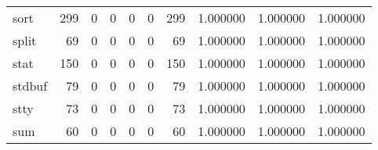 \begin{tabular}{lrrrrrrrrr}
sort      &                                       299 &                                                  0 &                                                  0 &                                                  0 &                                                  0 &                                                299 &                                           1.000000 &                               1.000000 &                             1.000000 \\
split     &                                        69 &                                                  0 &                                                  0 &                                                  0 &                                                  0 &                                                 69 &                                           1.000000 &                               1.000000 &                             1.000000 \\
stat      &                                       150 &                                                  0 &                                                  0 &                                                  0 &                                                  0 &                                                150 &                                           1.000000 &                               1.000000 &                             1.000000 \\
stdbuf    &                                        79 &                                                  0 &                                                  0 &                                                  0 &                                                  0 &                                                 79 &                                           1.000000 &                               1.000000 &                             1.000000 \\
stty      &                                        73 &                                                  0 &                                                  0 &                                                  0 &                                                  0 &                                                 73 &                                           1.000000 &                               1.000000 &                             1.000000 \\
sum       &                                        60 &                                                  0 &                                                  0 &                                                  0 &                                                  0 &                                                 60 &                                           1.000000 &                               1.000000 &                             1.000000 \\

\end{tabular}
